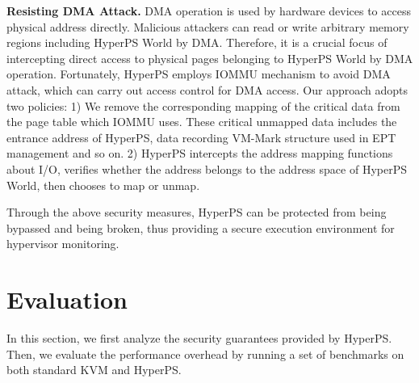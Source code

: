 ﻿\documentclass[conference]{IEEEtran}
\begin{document}
\textbf{Resisting DMA Attack.}
DMA operation is used by hardware devices to access physical address directly. Malicious attackers can read or write arbitrary memory regions including HyperPS World by DMA. Therefore, it is a crucial focus of intercepting direct access to physical pages belonging to HyperPS World by DMA operation. 
Fortunately, HyperPS employs IOMMU mechanism to avoid DMA attack, which can carry out access control for DMA access. Our approach adopts two policies: 1) We remove the corresponding mapping of the critical data from the page table which IOMMU uses. These critical unmapped data includes the entrance address of HyperPS, data recording VM-Mark structure used in EPT management and so on. 2) HyperPS intercepts the address mapping functions about I/O, verifies whether the address belongs to the address space of HyperPS World, then chooses to map or unmap.


Through the above security measures, HyperPS can be protected from being bypassed and being broken, thus providing a secure execution environment for hypervisor monitoring.





%
%

%
%





\section{Evaluation}\label{sec:evaluation}
In this section, we first analyze the security guarantees provided by HyperPS. Then, we evaluate the performance overhead by running a set of benchmarks on both standard KVM and HyperPS.
\end{document}
